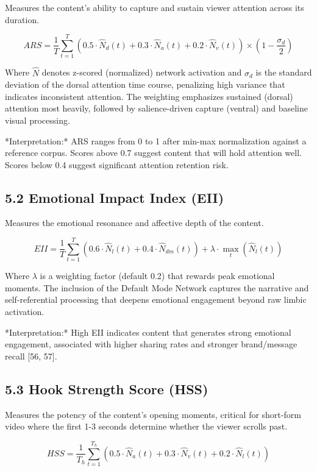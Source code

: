 \documentclass[11pt,letterpaper]{article}
\begin{document}
Measures the content's ability to capture and sustain viewer attention across its duration.

$$ARS = \frac{1}{T} \sum_{t=1}^{T} \left( 0.5 \cdot \hat{N}_d(t) + 0.3 \cdot \hat{N}_a(t) + 0.2 \cdot \hat{N}_v(t) \right) \times \left(1 - \frac{\sigma_d}{2}\right)$$

Where $\hat{N}$ denotes z-scored (normalized) network activation and $\sigma_d$ is the standard deviation of the dorsal attention time course, penalizing high variance that indicates inconsistent attention. The weighting emphasizes sustained (dorsal) attention most heavily, followed by salience-driven capture (ventral) and baseline visual processing.

*Interpretation:* ARS ranges from 0 to 1 after min-max normalization against a reference corpus. Scores above 0.7 suggest content that will hold attention well. Scores below 0.4 suggest significant attention retention risk.

\subsection{5.2 Emotional Impact Index (EII)}

Measures the emotional resonance and affective depth of the content.

$$EII = \frac{1}{T} \sum_{t=1}^{T} \left( 0.6 \cdot \hat{N}_l(t) + 0.4 \cdot \hat{N}_{dm}(t) \right) + \lambda \cdot \max_{t}(\hat{N}_l(t))$$

Where $\lambda$ is a weighting factor (default 0.2) that rewards peak emotional moments. The inclusion of the Default Mode Network captures the narrative and self-referential processing that deepens emotional engagement beyond raw limbic activation.

*Interpretation:* High EII indicates content that generates strong emotional engagement, associated with higher sharing rates and stronger brand/message recall [56, 57].

\subsection{5.3 Hook Strength Score (HSS)}

Measures the potency of the content's opening moments, critical for short-form video where the first 1-3 seconds determine whether the viewer scrolls past.

$$HSS = \frac{1}{T_h} \sum_{t=1}^{T_h} \left( 0.5 \cdot \hat{N}_a(t) + 0.3 \cdot \hat{N}_v(t) + 0.2 \cdot \hat{N}_l(t) \right)$$
\end{document}
